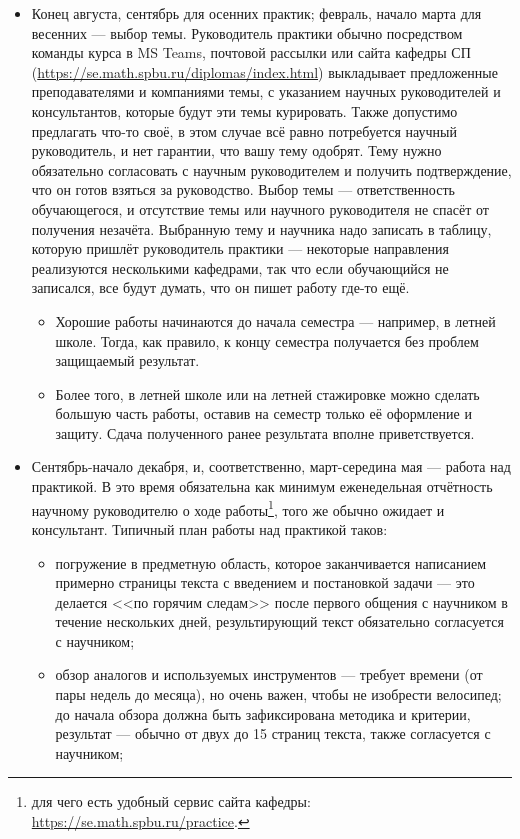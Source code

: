 \documentclass{article}
\begin{document}
\begin{itemize}
    \item Конец августа, сентябрь для осенних практик; февраль, начало марта для весенних --- выбор темы. Руководитель практики обычно посредством команды курса в MS Teams, почтовой рассылки или сайта кафедры СП (\url{https://se.math.spbu.ru/diplomas/index.html}) выкладывает предложенные преподавателями и компаниями темы, с указанием научных руководителей и консультантов, которые будут эти темы курировать. Также допустимо предлагать что-то своё, в этом случае всё равно потребуется научный руководитель, и нет гарантии, что вашу тему одобрят. Тему нужно обязательно согласовать с научным руководителем и получить подтверждение, что он готов взяться за руководство. Выбор темы --- ответственность обучающегося, и отсутствие темы или научного руководителя не спасёт от получения незачёта. Выбранную тему и научника надо записать в таблицу, которую пришлёт руководитель практики --- некоторые направления реализуются несколькими кафедрами, так что если обучающийся не записался, все будут думать, что он пишет работу где-то ещё.
    \begin{itemize}
        \item Хорошие работы начинаются до начала семестра --- например, в летней школе. Тогда, как правило, к концу семестра получается без проблем защищаемый результат.
        \item Более того, в летней школе или на летней стажировке можно сделать большую часть работы, оставив на семестр только её оформление и защиту. Сдача полученного ранее результата вполне приветствуется.
    \end{itemize}
    \item Сентябрь-начало декабря, и, соответственно, март-середина мая --- работа над практикой. В это время обязательна как минимум еженедельная отчётность научному руководителю о ходе работы\footnote{для чего есть удобный сервис сайта кафедры: \url{https://se.math.spbu.ru/practice}.}, того же обычно ожидает и консультант. Типичный план работы над практикой таков:
    \begin{itemize}
        \item погружение в предметную область, которое заканчивается написанием примерно страницы текста с введением и постановкой задачи --- это делается <<по горячим следам>> после первого общения с научником в течение нескольких дней, результирующий текст обязательно согласуется с научником;
        \item обзор аналогов и используемых инструментов --- требует времени (от пары недель до месяца), но очень важен, чтобы не изобрести велосипед; до начала обзора должна быть зафиксирована методика и критерии, результат --- обычно от двух до 15 страниц текста, также согласуется с научником;

\end{itemize}
\end{itemize}
\end{document}
